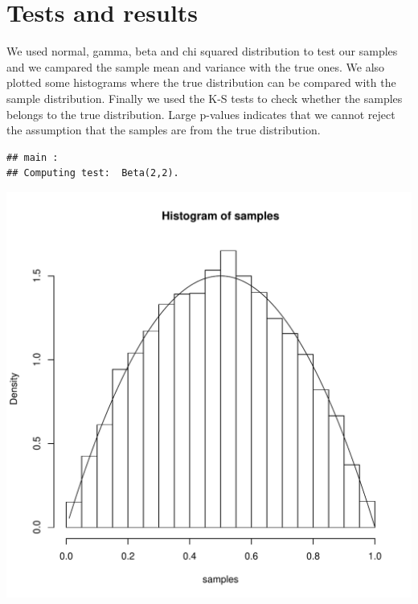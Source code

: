 \documentclass{llncs}\usepackage[]{graphicx}\usepackage[]{color}
\makeatletter
\def\maxwidth{ %
  \ifdim\Gin@nat@width>\linewidth
    \linewidth
  \else
    \Gin@nat@width
  \fi
}
\newenvironment{kframe}{%
 \def\at@end@of@kframe{}%
 \ifinner\ifhmode%
  \def\at@end@of@kframe{\end{minipage}}%
  \begin{minipage}{\columnwidth}%
 \fi\fi%
 \def\FrameCommand##1{\hskip\@totalleftmargin \hskip-\fboxsep
 \colorbox{shadecolor}{##1}\hskip-\fboxsep
     \hskip-\linewidth \hskip-\@totalleftmargin \hskip\columnwidth}%
 \MakeFramed {\advance\hsize-\width
   \@totalleftmargin\z@ \linewidth\hsize
   \@setminipage}}%
 {\par\unskip\endMakeFramed%
 \at@end@of@kframe}
\newenvironment{knitrout}{}{} %
\makeatother
\begin{document}
\section{Tests and results}
We used normal, gamma, beta and chi squared  distribution to test our samples and we campared the sample mean and variance with the true ones. We also plotted some histograms where the true distribution can be compared with the sample distribution. Finally we used the K-S tests to check whether the samples belongs to the true distribution. Large p-values indicates that we cannot reject the assumption that the samples are from the true distribution.
\begin{knitrout}
\color{fgcolor}\begin{kframe}


{\ttfamily\noindent\itshape\color{messagecolor}{\#\# Loading required package: testthat}}\begin{lstlisting}[basicstyle=\ttfamily,breaklines=true]
## main : 
## Computing test:  Beta(2,2).
\end{lstlisting}
\end{kframe}
\includegraphics[width=\maxwidth]{figure/Rt-1} 
\begin{kframe}\begin{lstlisting}[basicstyle=\ttfamily,breaklines=true]

\end{lstlisting}
\end{kframe}
\end{knitrout}
\end{document}
